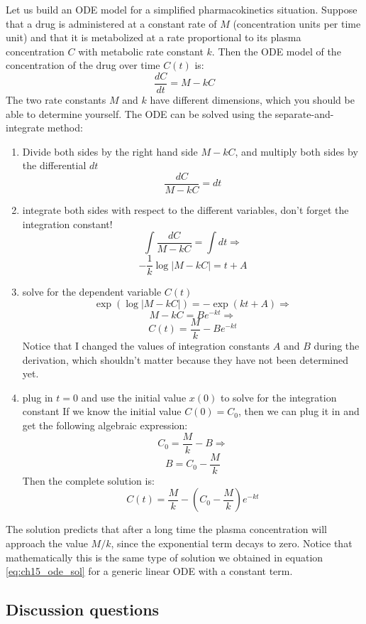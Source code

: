 \documentclass[
  letterpaper,
  DIV=11,
  numbers=noendperiod]{scrreprt}
\providecommand{\tightlist}{%
  \setlength{\itemsep}{0pt}\setlength{\parskip}{0pt}}\usepackage{longtable,booktabs,array}
\begin{document}
Let us build an ODE model for a simplified pharmacokinetics situation.
Suppose that a drug is administered at a constant rate of \(M\)
(concentration units per time unit) and that it is metabolized at a rate
proportional to its plasma concentration \(C\) with metabolic rate
constant \(k\). Then the ODE model of the concentration of the drug over
time \(C(t)\) is: \[ \frac{dC}{dt} = M - kC\] The two rate constants
\(M\) and \(k\) have different dimensions, which you should be able to
determine yourself. The ODE can be solved using the
separate-and-integrate method:

\begin{enumerate}
\def\labelenumi{\arabic{enumi}.}
\tightlist
\item
  Divide both sides by the right hand side \(M-kC\), and multiply both
  sides by the differential \(dt\) \[ \frac{dC}{M-kC} = dt\]
\item
  integrate both sides with respect to the different variables, don't
  forget the integration constant!
  \[ \int \frac{dC}{M-kC} = \int dt \Rightarrow\]
  \[ -\frac{1}{k} \log |M-kC| = t + A\]
\item
  solve for the dependent variable \(C(t)\)
  \[ \exp(\log |M-kC| ) = -\exp(kt +A) \Rightarrow \]
  \[  M - kC = B e^{-kt} \Rightarrow \]
  \[ C(t) = \frac{M}{k}- Be^{-kt}\] Notice that I changed the values of
  integration constants \(A\) and \(B\) during the derivation, which
  shouldn't matter because they have not been determined yet.
\item
  plug in \(t=0\) and use the initial value \(x(0)\) to solve for the
  integration constant If we know the initial value \(C(0) = C_0\), then
  we can plug it in and get the following algebraic expression:
  \[ C_0 =  \frac{M}{k} - B \Rightarrow \] \[ B = C_0 -  \frac{M}{k}\]
  Then the complete solution is:
  \[ C(t) =  \frac{M}{k} - (C_0- \frac{M}{k})e^{-kt}\]
\end{enumerate}

The solution predicts that after a long time the plasma concentration
will approach the value \(M/k\), since the exponential term decays to
zero. Notice that mathematically this is the same type of solution we
obtained in equation \ref{eq:ch15_ode_sol} for a generic linear ODE with
a constant term.

\hypertarget{discussion-questions-2}{%
\subsection{Discussion questions}\label{discussion-questions-2}}
\end{document}
